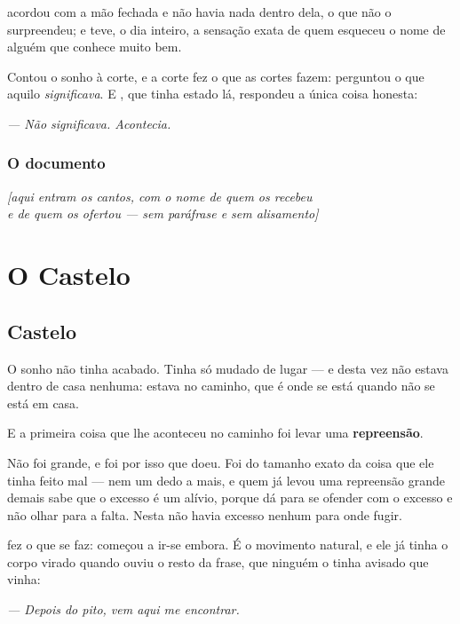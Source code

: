 \documentclass[livro.tex]{subfiles}
\begin{document}
\noindent \Ben acordou com a mão fechada e não havia nada dentro dela, o que
não o surpreendeu; e teve, o dia inteiro, a sensação exata de quem esqueceu o
nome de alguém que conhece muito bem.

\medskip
\noindent Contou o sonho à corte, e a corte fez o que as cortes fazem: perguntou
o que aquilo \emph{significava}. E \Ben , que tinha estado lá, respondeu a
única coisa honesta:

\begin{center}
\emph{--- Não significava. Acontecia.}
\end{center}

\section{O documento}

\begin{center}\itshape
[aqui entram os cantos, com o nome de quem os recebeu\\
e de quem os ofertou --- sem paráfrase e sem alisamento]
\end{center}

\part{O Castelo}

\chapter{Castelo}

O sonho não tinha acabado. Tinha só mudado de lugar --- e desta vez \Ben não
estava dentro de casa nenhuma: estava no caminho, que é onde se está quando não
se está em casa.

E a primeira coisa que lhe aconteceu no caminho foi levar uma \textbf{repreensão}.

\medskip
\noindent Não foi grande, e foi por isso que doeu. Foi do tamanho exato da coisa
que ele tinha feito mal --- nem um dedo a mais, e quem já levou uma repreensão
grande demais sabe que o excesso é um alívio, porque dá para se ofender com o
excesso e não olhar para a falta. Nesta não havia excesso nenhum para onde
fugir.

\medskip
\noindent \Ben fez o que se faz: começou a ir-se embora. É o movimento
natural, e ele já tinha o corpo virado quando ouviu o resto da frase, que
ninguém o tinha avisado que vinha:

\begin{center}
\emph{--- Depois do pito, vem aqui me encontrar.}
\end{center}
\end{document}
